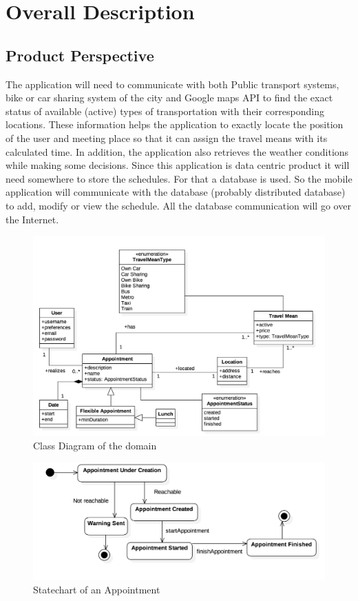 \documentclass[12pt]{article}
\begin{document}
\section{Overall Description}

\subsection{Product Perspective}
The application will need to communicate with both Public transport systems, bike or car sharing system of the city and Google maps API to find the exact status of available (active) types of transportation with their corresponding locations. These information helps the application to exactly locate the position of the user and meeting place so that it can assign the travel means with its calculated time. In addition, the application also retrieves the weather conditions while making some decisions. 
Since this application is data centric product it will need somewhere to store the schedules. For that a database is used. So the mobile application will communicate with the database (probably distributed database) to add, modify or view the schedule. All the database communication will go over the Internet.
    \begin{figure}[H]
        \includegraphics[scale=0.27]{domainModel.png}
        \caption{Class Diagram of the domain}
        \centering
    \label{fig:domainModel}
    \end{figure}
    \begin{figure}[H]
    \centering
        \includegraphics[scale=0.4]{statechartAppointment.png}
        \caption{Statechart of an Appointment}
    \label{fig:domainModel}
    \end{figure}
    
\end{document}
